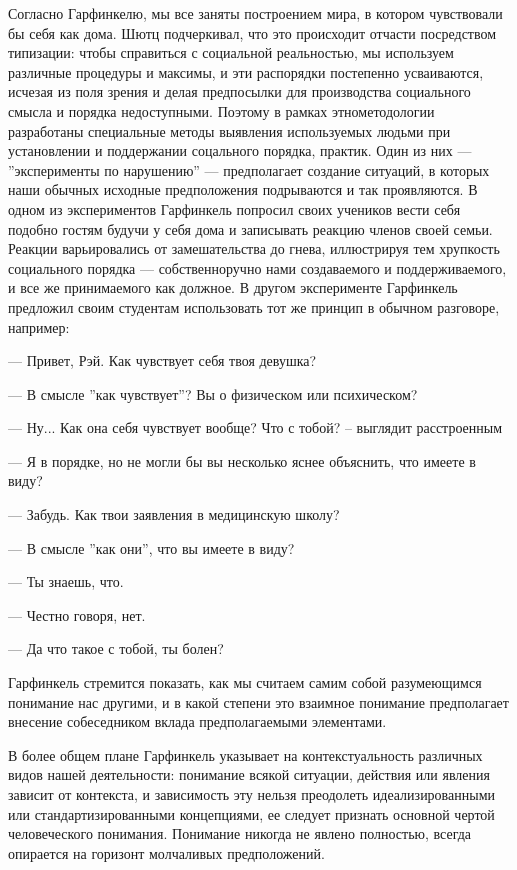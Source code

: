 \documentclass[11pt]{book}
\begin{document}
Согласно Гарфинкелю, мы все заняты построением мира, в котором чувствовали бы себя как дома. Шютц подчеркивал, что это происходит отчасти посредством типизации: чтобы справиться с социальной реальностью, мы используем различные процедуры и максимы, и эти распорядки постепенно усваиваются, исчезая из поля зрения и делая предпосылки для производства социального смысла и порядка недоступными. Поэтому в рамках этнометодологии разработаны специальные методы выявления используемых людьми при установлении и поддержании соцального порядка, практик. Один из них --- ''эксперименты по нарушению'' --- предполагает создание ситуаций, в которых наши обычных исходные предположения подрываются и так проявляются. В одном из экспериментов Гарфинкель попросил своих учеников вести себя подобно гостям будучи у себя дома и записывать реакцию членов своей семьи. Реакции варьировались от замешательства до гнева, иллюстрируя тем хрупкость социального порядка --- собственноручно нами создаваемого и поддерживаемого, и все же принимаемого как должное. В другом эксперименте Гарфинкель предложил своим студентам использовать тот же принцип в обычном разговоре, например:

\smallskip
{}\relax
{}\relax

--- Привет, Рэй. Как чувствует себя твоя девушка?

--- В смысле ''как чувствует''? Вы о физическом или психическом?

--- Ну... Как она себя чувствует вообще? Что с тобой? -- выглядит расстроенным

--- Я в порядке, но не могли бы вы несколько яснее объяснить, что имеете в виду?

--- Забудь. Как твои заявления в медицинскую школу?

--- В смысле ''как они'', что вы имеете в виду?

--- Ты знаешь, что.

--- Честно говоря, нет.

--- Да что такое с тобой, ты болен?

\relax
{}\relax
\smallskip

Гарфинкель стремится показать, как мы считаем самим собой разумеющимся понимание нас другими, и в какой степени это взаимное понимание предполагает внесение собеседником вклада предполагаемыми элементами.

В более общем плане Гарфинкель указывает на контекстуальность различных видов нашей деятельности: понимание всякой ситуации, действия или явления зависит от контекста, и зависимость эту нельзя преодолеть идеализированными или стандартизированными концепциями, ее следует признать основной чертой человеческого понимания. Понимание никогда не явлено полностью, всегда опирается на горизонт молчаливых предположений.
\end{document}
